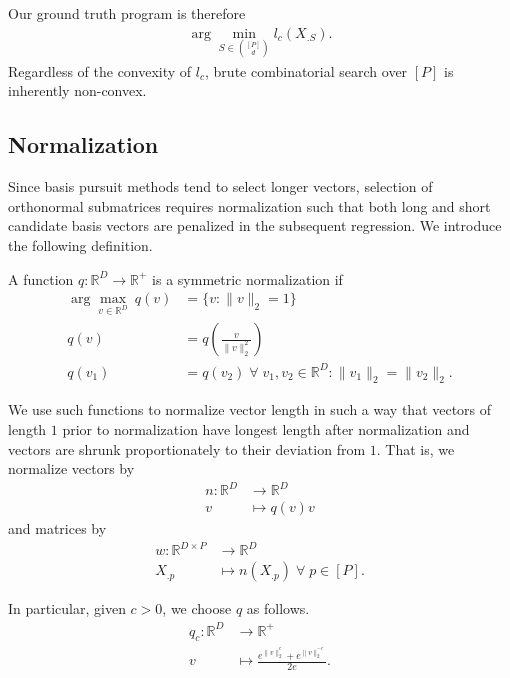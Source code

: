 Our ground truth program is therefore 
\begin{align}
\label{prog:ground_truth}
\arg \min_{ S \in \binom{[P]}{d}} l_c ( X_{. S}).
\end{align}
Regardless of the convexity of $l_c$, brute combinatorial search over $[P]$ is inherently non-convex.

\subsection{Normalization}
\label{sec:normalization}

Since basis pursuit methods tend to select longer vectors, selection of orthonormal submatrices requires normalization such that both long and short candidate basis vectors are penalized in the subsequent regression.
We introduce the following definition.

\begin{definition}
A function $q: \mathbb R^D \to \mathbb R^+ $ is a symmetric normalization if 
\begin{align}
\arg \max_{v \in \mathbb R^D} \ q (v) &=\{ v : \|v\|_2 = 1 \} \\
q(v) &= q(\frac{v}{\|v\|_2^2}) \\
q(v_1) &= q(v_2) \; \forall \; v_1, v_2 \in \mathbb R^D : \|v_1\|_2 = \|v_2\|_2.
\end{align} \label{def:symmetric_normalization}
\end{definition}

We use such functions to normalize vector length in such a way that vectors of length $1$ prior to normalization have longest length after normalization and vectors are shrunk proportionately to their deviation from $1$. 
That is, we normalize vectors by 
\begin{align}
n: \mathbb R^D  &\to \mathbb R^D \\
v &\mapsto {q(v) }v
\end{align}
and matrices by
\begin{align}
w: \mathbb R^{D \times P}  &\to \mathbb R^D \\
 X_{.p} &\mapsto n( X_{.p}) \; \forall \; p \in [P].
\end{align}

In particular, given $c > 0$, we choose $q$ as follows.
\begin{align}
q_c: \mathbb R^D  &\to \mathbb R^+ \\
v  &\mapsto \frac{e^{\|v\|_2^c} + e^{\|v\|_2^{-c}}}{2e}.
\label{eq:normalization}
\end{align}

